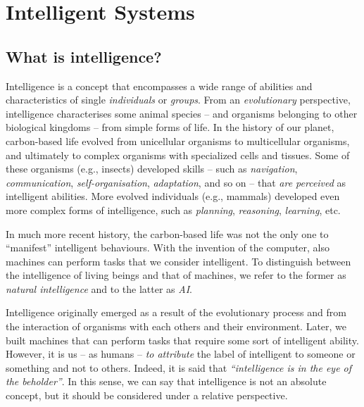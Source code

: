 
\chapter{Intelligent Systems}
\label{ch:intelligent-systems}
\minitoc

\section{What is intelligence?}\label{sec:what-is-intelligence}

Intelligence is a concept that encompasses a wide range of abilities and characteristics of single \emph{individuals} or \emph{groups}.
%
From an \emph{evolutionary} perspective, intelligence characterises some animal species -- and organisms belonging to other biological kingdoms -- from simple forms of life.
%
In the history of our planet, carbon-based life evolved from unicellular organisms to multicellular organisms, and ultimately to complex organisms with specialized cells and tissues.
%
Some of these organisms (e.g., insects) developed skills -- such as \emph{navigation}, \emph{communication}, \emph{self-organisation}, \emph{adaptation}, and so on -- that \emph{are perceived} as intelligent abilities.
%
More evolved individuals (e.g., mammals) developed even more complex forms of intelligence, such as \emph{planning}, \emph{reasoning}, \emph{learning}, etc.


In much more recent history, the carbon-based life was not the only one to ``manifest'' intelligent behaviours.
%
With the invention of the computer, also machines can perform tasks that we consider intelligent.
%
To distinguish between the intelligence of living beings and that of machines, we refer to the former as \emph{natural intelligence} and to the latter as \emph{\gls{AI}}.


Intelligence originally emerged as a result of the evolutionary process and from the interaction of organisms with each others and their environment.
%
Later, we built machines that can perform tasks that require some sort of intelligent ability.
%
However, it is us -- as humans -- \emph{to attribute} the label of intelligent to someone or something and not to others.
%
Indeed, it is said that \emph{``intelligence is in the eye of the beholder''}.
%
In this sense, we can say that intelligence is not an absolute concept, but it should be considered under a relative perspective.



